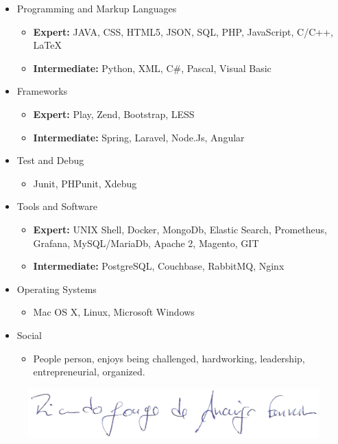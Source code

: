 \documentclass[letterpaper,11pt]{article}
\newcommand{\resitem}[1]{\item #1 \vspace{2pt}}
\begin{document}
\begin{itemize}
\item
	Programming and Markup Languages
	\begin{itemize}
		\resitem{{\bf Expert:}  JAVA, CSS, HTML5, JSON, SQL, PHP, JavaScript, C/C++, \LaTeX}
		\resitem{{\bf Intermediate:} Python, XML, C\#, Pascal, Visual Basic}
    \end{itemize}
\end{itemize} 
\hspace{20pt}
\begin{itemize}
\item
	Frameworks
	\begin{itemize}
		\resitem{{\bf Expert:} Play, Zend, Bootstrap, LESS}
		\resitem{{\bf Intermediate:} Spring, Laravel, Node.Js, Angular}
	\end{itemize}
	
	\item
	Test and Debug
	\begin{itemize}
		\resitem{Junit, PHPunit, Xdebug}
	\end{itemize}

\item
	Tools and Software
	\begin{itemize}
		\resitem{{\bf Expert:} UNIX Shell, Docker, MongoDb, Elastic Search, Prometheus, Grafana, MySQL/MariaDb, Apache 2, Magento, GIT}
		\resitem{{\bf Intermediate:} PostgreSQL, Couchbase, RabbitMQ, Nginx}
	\end{itemize}
	
	\item
	Operating Systems
	\begin{itemize}
		\resitem{Mac OS X, Linux, Microsoft Windows}
	\end{itemize}

	\item
	Social
	\begin{itemize}
		\resitem{People person, enjoys being challenged, hardworking, leadership, entrepreneurial, organized.}
	\end{itemize}
\end{itemize}



\vspace{5mm}

\begin{figure}[h]
\centering
{\includegraphics[scale=0.25]{img/sig.png}}
\end{figure}
\end{document}
